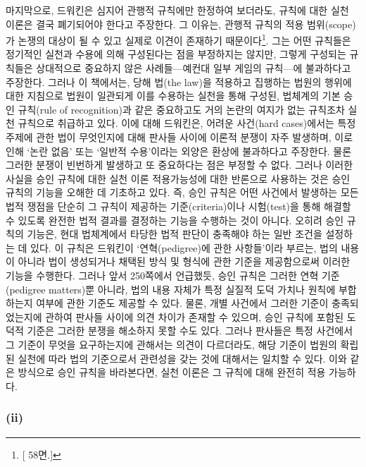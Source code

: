 마지막으로, 드워킨은 심지어 관행적 규칙에만 한정하여 보더라도, 규칙에
대한 실천 이론은 결국 폐기되어야 한다고 주장한다. 그 이유는, 관행적
규칙의 적용 범위(scope)가 논쟁의 대상이 될 수 있고 실제로 이견이
존재하기 때문이다\footnote{{[} 58면.{]}}. 그는 어떤 규칙들은
정기적인 실천과 수용에 의해 구성된다는 점을 부정하지는 않지만, 그렇게
구성되는 규칙들은 상대적으로 중요하지 않은 사례들---예컨대 일부 게임의
규칙---에 불과하다고 주장한다. 그러나 이 책에서는, 당해 법(the law)을
적용하고 집행하는 법원의 행위에 대한 지침으로 법원이 일관되게 이를
수용하는 실천을 통해 구성된, 법체계의 기본 승인 규칙(rule of
recognition)과 같은 중요하고도 거의 논란의 여지가 없는 규칙조차 실천
규칙으로 취급하고 있다. 이에 대해 드워킨은, 어려운 사건(hard
cases)에서는 특정 주제에 관한 법이 무엇인지에 대해 판사들 사이에 이론적
분쟁이 자주 발생하며, 이로 인해 `논란 없음' 또는 `일반적 수용'이라는
외양은 환상에 불과하다고 주장한다. 물론 그러한 분쟁이 빈번하게 발생하고
또 중요하다는 점은 부정할 수 없다. 그러나 이러한 사실을 승인 규칙에 대한
실천 이론 적용가능성에 대한 반론으로 사용하는 것은 승인 규칙의 기능을
오해한 데 기초하고 있다. 즉, 승인 규칙은 어떤 사건에서 발생하는 모든
법적 쟁점을 단순히 그 규칙이 제공하는 기준(criteria)이나 시험(test)을
통해 해결할 수 있도록 완전한 법적 결과를 결정하는 기능을 수행하는 것이
아니다. 오히려 승인 규칙의 기능은, 현대 법체계에서 타당한 법적 판단이
충족해야 하는 일반 조건을 설정하는 데 있다. 이 규칙은 드워킨이
`연혁(pedigree)에 관한 사항들'이라 부르는, 법의 내용이 아니라 법이
생성되거나 채택된 방식 및 형식에 관한 기준을 제공함으로써 이러한 기능을
수행한다. 그러나 앞서 250쪽에서 언급했듯, 승인 규칙은 그러한 연혁
기준(pedigree matters)뿐 아니라, 법의 내용 자체가 특정 실질적 도덕
가치나 원칙에 부합하는지 여부에 관한 기준도 제공할 수 있다. 물론, 개별
사건에서 그러한 기준이 충족되었는지에 관하여 판사들 사이에 의견 차이가
존재할 수 있으며, 승인 규칙에 포함된 도덕적 기준은 그러한 분쟁을
해소하지 못할 수도 있다. 그러나 판사들은 특정 사건에서 그 기준이 무엇을
요구하는지에 관해서는 의견이 다르더라도, 해당 기준이 법원의 확립된
실천에 따라 법의 기준으로서 관련성을 갖는 것에 대해서는 일치할 수 있다.
이와 같은 방식으로 승인 규칙을 바라본다면, 실천 이론은 그 규칙에 대해
완전히 적용 가능하다.

\subsubsection{\texorpdfstring{(ii) }{(ii) 규칙(rules)과 원칙(principles)}}\label{ii-uxaddcuxce59rulesuxacfc-uxc6d0uxce59principles}

